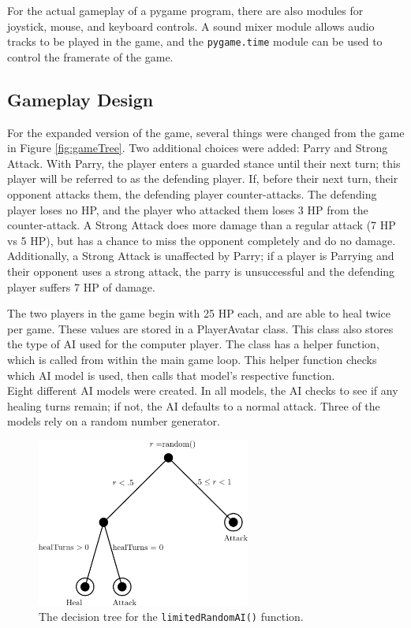 For the actual gameplay of a pygame program, there are also modules for joystick, mouse, and keyboard controls. A sound mixer module allows audio tracks to be played in the game, and the \texttt{pygame.time} module can be used to control the framerate of the game.

\subsection{Gameplay Design}
For the expanded version of the game, several things were changed from the game in Figure \ref{fig:gameTree}. Two additional choices were added: Parry and Strong Attack. With Parry, the player enters a guarded stance until their next turn; this player will be referred to as the defending player. If, before their next turn, their opponent attacks them, the defending player counter-attacks. The defending player loses no HP, and the player who attacked them loses 3 HP from the counter-attack. A Strong Attack does more damage than a regular attack (7 HP vs 5 HP), but has a chance to miss the opponent completely and do no damage. Additionally, a Strong Attack is unaffected by Parry; if a player is Parrying and their opponent uses a strong attack, the parry is unsuccessful and the defending player suffers 7 HP of damage.

The two players in the game begin with 25 HP each, and are able to heal twice per game. These values are stored in a PlayerAvatar class. This class also stores the type of AI used for the computer player. The class has a helper function, which is called from within the main game loop. This helper function checks which AI model is used, then calls that model's respective function.\\

Eight different AI models were created. In all models, the AI checks to see if any healing turns remain; if not, the AI defaults to a normal attack. Three of the models rely on a random number generator.\\

\begin{figure}[H]
  \centering
  \includegraphics[width=7cm]{figures/AILimitedRandom.png}
  \caption{The decision tree for the \texttt{limitedRandomAI()} function.}
  \label{fig:AI1}
\end{figure}

